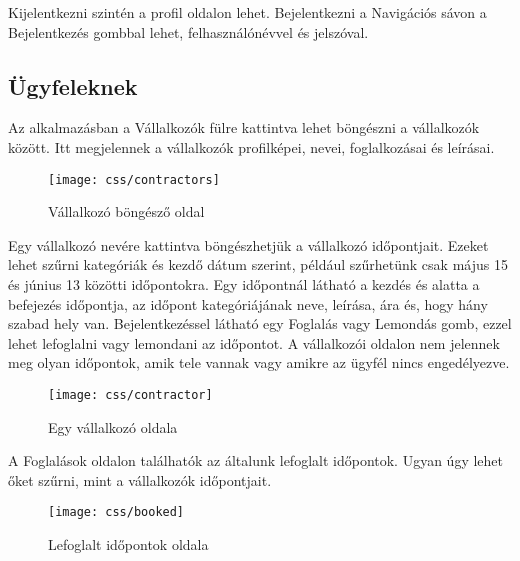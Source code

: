 
Kijelentkezni szintén a profil oldalon lehet. Bejelentkezni a Navigációs sávon a Bejelentkezés gombbal lehet, felhasználónévvel és jelszóval.



\subsection{Ügyfeleknek}

Az alkalmazásban a Vállalkozók fülre kattintva lehet böngészni a vállalkozók között. Itt megjelennek a vállalkozók profilképei, nevei, foglalkozásai és leírásai.

\begin{figure}[H]
    \centering
    \texttt{[image: css/contractors]}
    \caption{Vállalkozó böngésző oldal}
\end{figure}

Egy vállalkozó nevére kattintva böngészhetjük a vállalkozó időpontjait. Ezeket lehet szűrni kategóriák és kezdő dátum szerint, például szűrhetünk csak május 15 és június 13 közötti időpontokra. Egy időpontnál látható a kezdés és alatta a befejezés időpontja, az időpont kategóriájának neve, leírása, ára és, hogy hány szabad hely van. Bejelentkezéssel látható egy Foglalás vagy Lemondás gomb, ezzel lehet lefoglalni vagy lemondani az időpontot. A vállalkozói oldalon nem jelennek meg olyan időpontok, amik tele vannak vagy amikre az ügyfél nincs engedélyezve.

\begin{figure}[H]
    \centering
    \texttt{[image: css/contractor]}
    \caption{Egy vállalkozó oldala}
\end{figure}

A Foglalások oldalon találhatók az általunk lefoglalt időpontok. Ugyan úgy lehet őket szűrni, mint a vállalkozók időpontjait.

\begin{figure}[H]
    \centering
    \texttt{[image: css/booked]}
    \caption{Lefoglalt időpontok oldala}
\end{figure}

